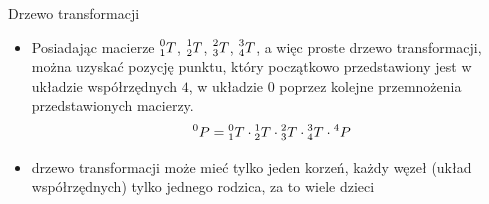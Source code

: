 \begin{frame}
{Drzewo transformacji}
	\begin{itemize}
		\item 
		Posiadając macierze $\prescript{0}{1}T$, $\prescript{1}{2}T$, $\prescript{2}{3}T$, $\prescript{3}{4}T$, a więc proste drzewo transformacji, można uzyskać pozycję punktu, który początkowo przedstawiony jest w układzie współrzędnych $4$, w układzie $0$ poprzez kolejne przemnożenia przedstawionych macierzy. 
		\begin{equation*}
			\prescript{0}{}P = \prescript{0}{1}T \cdot \prescript{1}{2}T \cdot \prescript{2}{3}T \cdot \prescript{3}{4}T \cdot \prescript{4}{}P
		\end{equation*}
		\item drzewo transformacji może mieć tylko jeden korzeń, każdy węzeł (układ współrzędnych) tylko jednego rodzica, za to wiele dzieci
	\end{itemize}
	
	
\end{frame}

